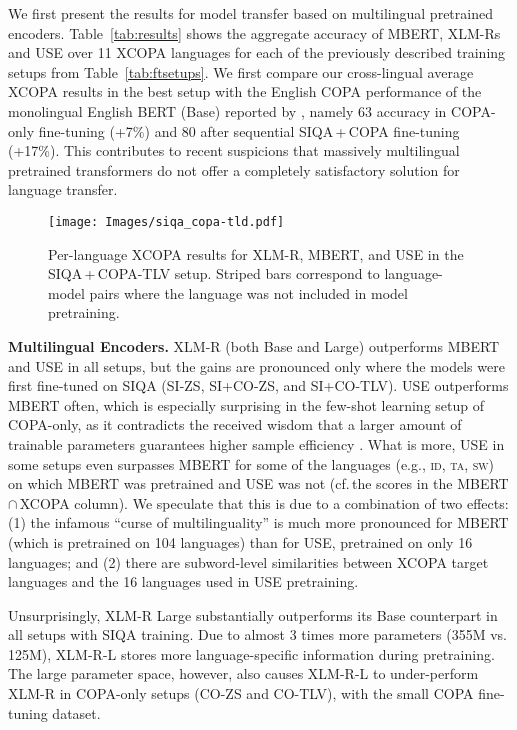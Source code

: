 \documentclass[11pt,a4paper]{article}
\begin{document}
We first present the results for model transfer based on multilingual pretrained encoders. Table~\ref{tab:results} shows the aggregate accuracy of MBERT, XLM-Rs and USE over 11 XCOPA languages for each of the previously described training setups from Table~\ref{tab:ftsetups}. We first compare our cross-lingual average XCOPA results in the best setup with the English COPA performance of the monolingual English BERT (Base) reported by , namely 63 accuracy in COPA-only fine-tuning (+7\%) and 80 after sequential SIQA\,+\,COPA fine-tuning (+17\%). This contributes to recent suspicions \cite{cao2020multilingual,Hu:2020arxiv} that massively multilingual pretrained transformers do not offer a completely satisfactory solution for language transfer.
\begin{figure*}[!t]
    \centering
    \texttt{[image: Images/siqa\_copa-tld.pdf]}
    \vspace{-3.5mm}
    \caption{Per-language XCOPA results for XLM-R, MBERT, and USE in the SIQA\,+\,COPA-TLV setup. Striped bars correspond to language-model pairs where the language was not included in model pretraining.}
    \label{fig:lang_res}
    \vspace{-1.5mm}
\end{figure*}


\vspace{1.4mm}
\noindent \textbf{Multilingual Encoders.} XLM-R (both Base and Large) outperforms MBERT and USE in all setups, but the gains are pronounced only where the models were first fine-tuned on SIQA (SI-ZS, SI+CO-ZS, and SI+CO-TLV). USE outperforms MBERT often, which is especially surprising in the few-shot learning setup of COPA-only, as it contradicts the received wisdom that a larger amount of trainable parameters guarantees higher sample efficiency \citep{kaplan2020scaling}.
What is more, USE in some setups even surpasses MBERT for some of the languages (e.g., \textsc{id}, \textsc{ta}, \textsc{sw}) on which MBERT was pretrained and USE was not (cf.\,the scores in the MBERT\,$\cap$\,XCOPA column). We speculate that this is due to a combination of two effects: (1) the infamous ``curse of multilinguality'' \cite{conneau2019unsupervised} is much more pronounced for MBERT (which is pretrained on 104 languages) than for USE, pretrained on only 16 languages; and (2) there are subword-level similarities between XCOPA target languages and the 16 languages used in USE pretraining.


Unsurprisingly, XLM-R Large substantially outperforms its Base counterpart in all setups with SIQA training. Due to almost 3 times more parameters (355M vs.\,125M), XLM-R-L stores more language-specific information during pretraining. The large parameter space, however, also causes XLM-R-L to under-perform XLM-R in COPA-only setups (CO-ZS and CO-TLV), with the small COPA fine-tuning dataset.
\end{document}

